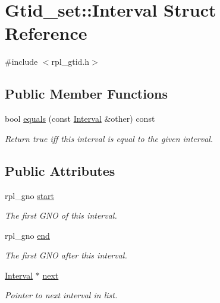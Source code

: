 \hypertarget{structGtid__set_1_1Interval}{}\section{Gtid\+\_\+set\+:\+:Interval Struct Reference}
\label{structGtid__set_1_1Interval}


{\ttfamily \#include $<$rpl\+\_\+gtid.\+h$>$}

\subsection*{Public Member Functions}
\begin{DoxyCompactItemize}
\item 
\mbox{\label{structGtid__set_1_1Interval_ac80088d6eecf0eee33e96c0bfaf66c1d}} 
bool \mbox{\hyperlink{structGtid__set_1_1Interval_ac80088d6eecf0eee33e96c0bfaf66c1d}{equals}} (const \mbox{\hyperlink{structGtid__set_1_1Interval}{Interval}} \&other) const
\begin{DoxyCompactList}\small\item\em Return true iff this interval is equal to the given interval. \end{DoxyCompactList}\end{DoxyCompactItemize}
\subsection*{Public Attributes}
\begin{DoxyCompactItemize}
\item 
\mbox{\label{structGtid__set_1_1Interval_a0786a895f41f0f6095d5437fbe7854e3}} 
rpl\+\_\+gno \mbox{\hyperlink{structGtid__set_1_1Interval_a0786a895f41f0f6095d5437fbe7854e3}{start}}
\begin{DoxyCompactList}\small\item\em The first G\+NO of this interval. \end{DoxyCompactList}\item 
\mbox{\label{structGtid__set_1_1Interval_a2a3ca57b8f934e3c8508cb36b0209589}} 
rpl\+\_\+gno \mbox{\hyperlink{structGtid__set_1_1Interval_a2a3ca57b8f934e3c8508cb36b0209589}{end}}
\begin{DoxyCompactList}\small\item\em The first G\+NO after this interval. \end{DoxyCompactList}\item 
\mbox{\label{structGtid__set_1_1Interval_af6fe023b1dc03f396c3f435fd4c02e7d}} 
\mbox{\hyperlink{structGtid__set_1_1Interval}{Interval}} $\ast$ \mbox{\hyperlink{structGtid__set_1_1Interval_af6fe023b1dc03f396c3f435fd4c02e7d}{next}}
\begin{DoxyCompactList}\small\item\em Pointer to next interval in list. \end{DoxyCompactList}\end{DoxyCompactItemize}


